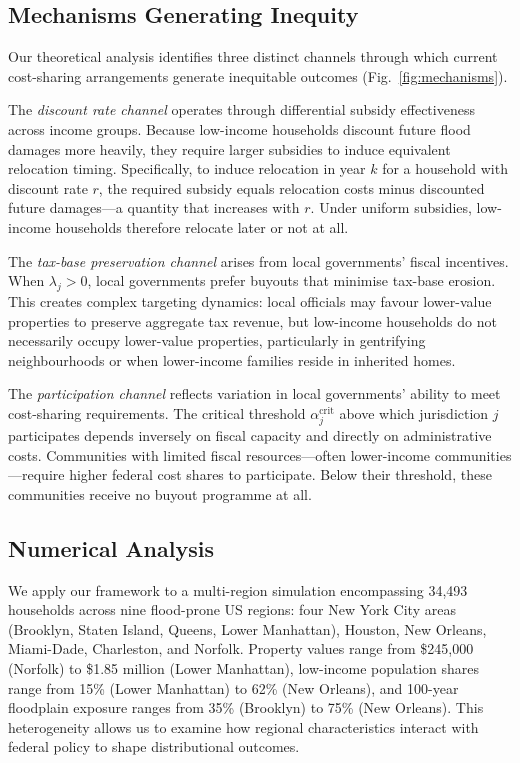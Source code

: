 \documentclass[11pt,letterpaper]{article}
\theoremstyle{definition}
\begin{document}
\subsection{Mechanisms Generating Inequity}

Our theoretical analysis identifies three distinct channels through which current cost-sharing arrangements generate inequitable outcomes (Fig.~\ref{fig:mechanisms}).

The \textit{discount rate channel} operates through differential subsidy effectiveness across income groups. Because low-income households discount future flood damages more heavily, they require larger subsidies to induce equivalent relocation timing. Specifically, to induce relocation in year $k$ for a household with discount rate $r$, the required subsidy equals relocation costs minus discounted future damages---a quantity that increases with $r$. Under uniform subsidies, low-income households therefore relocate later or not at all.

The \textit{tax-base preservation channel} arises from local governments' fiscal incentives. When $\lambda_j > 0$, local governments prefer buyouts that minimise tax-base erosion. This creates complex targeting dynamics: local officials may favour lower-value properties to preserve aggregate tax revenue, but low-income households do not necessarily occupy lower-value properties, particularly in gentrifying neighbourhoods or when lower-income families reside in inherited homes.

The \textit{participation channel} reflects variation in local governments' ability to meet cost-sharing requirements. The critical threshold $\alpha_j^{\text{crit}}$ above which jurisdiction $j$ participates depends inversely on fiscal capacity and directly on administrative costs. Communities with limited fiscal resources---often lower-income communities---require higher federal cost shares to participate. Below their threshold, these communities receive no buyout programme at all.

\subsection{Numerical Analysis}

We apply our framework to a multi-region simulation encompassing 34,493 households across nine flood-prone US regions: four New York City areas (Brooklyn, Staten Island, Queens, Lower Manhattan), Houston, New Orleans, Miami-Dade, Charleston, and Norfolk. Property values range from \$245,000 (Norfolk) to \$1.85 million (Lower Manhattan), low-income population shares range from 15\% (Lower Manhattan) to 62\% (New Orleans), and 100-year floodplain exposure ranges from 35\% (Brooklyn) to 75\% (New Orleans). This heterogeneity allows us to examine how regional characteristics interact with federal policy to shape distributional outcomes.
\end{document}
